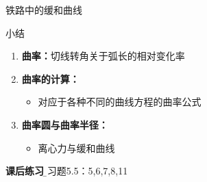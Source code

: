 \begin{frame}{铁路中的缓和曲线}
	\linespread{1.2}\pause 
	\pause 
	\begin{center}
	\end{center}
\end{frame}

\begin{frame}[<+->]{小结}
	\linespread{1.5}
	\begin{enumerate}
	  \item {\bf 曲率：}切线转角关于弧长的相对变化率
	  \item {\bf 曲率的计算：}
	  \begin{itemize}
	    \item 对应于各种不同的曲线方程的曲率公式
	  \end{itemize}
	  \item {\bf 曲率圆与曲率半径：}
	  \begin{itemize}
	    \item 离心力与缓和曲线
	  \end{itemize}
	\end{enumerate}
	\begin{block}{{\bf 课后练习}\hfill}
		{\b\quad 习题5.5：5,6,7,8,11}
	\end{block}
\end{frame}